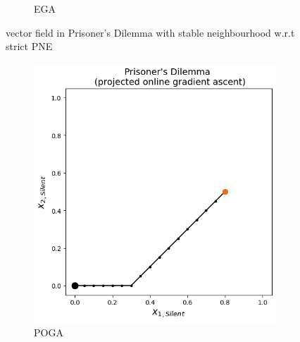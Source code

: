 \begin{figure}[H]
\begin{subfigure}{.5\textwidth}
    \caption{EGA}
\end{subfigure}
\caption{vector field in Prisoner's Dilemma with stable neighbourhood w.r.t strict PNE}
\label{fig:Prisoner}
\end{figure}

\begin{figure}[H]
\captionsetup{justification=centering}
\centering
\begin{subfigure}{.5\textwidth}
    \centering
    \includegraphics[width=\textwidth]{logos/Prisoner4.png}
    \caption{POGA}
\end{subfigure}%
\begin{subfigure}{.5\textwidth}
    \centering

\end{subfigure}
\end{figure}
